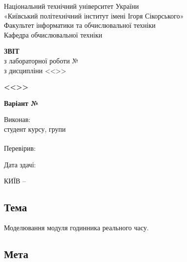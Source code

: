 \documentclass[14pt, a4paper]{extreport}
\begin{document}
	
	\begin{titlepage}
		\begin{center}
			\normalsize
			Національний технічний університет України\\
			«Київський політехнічний інститут імені Ігоря Сікорського» \\[0.5em]
			Факультет інформатики та обчислювальної техніки\\
			Кафедра обчислювальної техніки
			
			\vfill
			
			{\large \textbf{ЗВІТ}\\[0.5em]}
			{з лабораторної роботи №\LabNumber \\}
			{з дисципліни <<\CourseTitle>>}
			
			\vspace{2em}
			
			{\textbf{<<\Topic>>}}
			
			\vspace{1em}
			
			{\textbf{Варіант №\Variant}}
			
			\vfill
			
			\begin{flushright}
				Виконав: \\ студент \CourseNumber{} курсу, групи \StudentGroup \\
				\StudentName \\[1em]
				Перевірив: \\ \Teacher
			\end{flushright}
			
			\vfill
			
			\begin{flushright}
				Дата здачі: \DTMtoday
			\end{flushright}
			
			\vspace{5em}
			КИЇВ -- \ReportYear
		\end{center}
	\end{titlepage}
	
	\clearpage
	\setcounter{page}{2}
	
	\subsection*{Тема} 
	
	Моделювання модуля годинника реального часу.
	
	\subsection*{Мета} 
	
\end{document}
